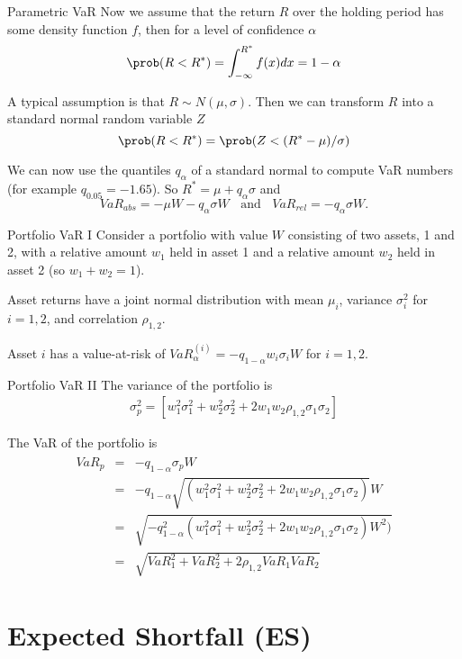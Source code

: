 Parametric VaR
	Now we assume that the return $R$ over the holding period has some density function $f$, then for a level of
	confidence $\alpha$
		$$
		\prob(R <R^*)=\int_{-\infty}^{R^*}f(x)dx = 1-\alpha
		$$
 
	A typical assumption is that $R \sim N(\mu, \sigma)$. Then we can transform $R$ into a standard normal random variable $Z$
		$$
		\prob(R<R^*)=\prob(Z< (R^*-\mu)/\sigma)
		$$
 
	We can now use the quantiles $q_\alpha$ of a standard normal to compute VaR numbers 
	(for example $q_{0.05}=-1.65$). So $R^*= \mu + q_\alpha\sigma$ and
		$$
		VaR_{abs}=-\mu W-q_\alpha\sigma W \;\; \mbox{ and } \;\; VaR_{rel}= -q_{\alpha}\sigma W.
		$$


Portfolio VaR I
	Consider a portfolio with value $W$ consisting of two assets, 1 and 2,
	with a relative amount $w_1$ held in asset 1 and a relative amount $w_2$ held in asset 2 (so $w_1+w_2=1$). 
	
	Asset returns have a joint normal distribution with mean $\mu_i$,
	variance $\sigma^2_i$ for $i=1,2$, and correlation $\rho_{1,2}$.
	
	Asset $i$ has a value-at-risk of $VaR_\alpha^{(i)}=-q_{1-\alpha}
	w_i\sigma_i W$ for $i=1,2$.


Portfolio VaR II
	The variance of the portfolio is
  	\begin{align*}
  		\sigma_p^2= \left[w_1^2\sigma_1^2+ w_2^2\sigma_2^2+2
  		w_1w_2\rho_{1,2}\sigma_1\sigma_2\right]
		\end{align*}
  
The VaR of the portfolio is
	\begin{align*}
		\begin{array}{lll}
			VaR_p &=& - q_{1-\alpha}\sigma_p W \\
		  &=& -q_{1-\alpha} \sqrt{\left(w_1^2\sigma_1^2+w_2^2\sigma_2^2 +2
		    w_1w_2\rho_{1,2}\sigma_1\sigma_2\right)}W\\
		  &=& \sqrt{-q_{1-\alpha}^2\left( w_1^2\sigma_1^2+w_2^2\sigma_2^2 +2
		    w_1w_2\rho_{1,2}\sigma_1\sigma_2\right) W^2 )}\\
		  &=& \sqrt{VaR_1^2+ VaR_2^2+2 \rho_{1,2}VaR_1VaR_2}
		\end{array}
	\end{align*}


\section{Expected Shortfall (ES) }

